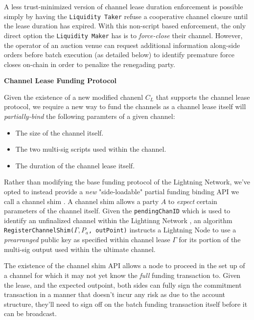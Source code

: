 \documentclass[10pt,a4paper]{article}
\theoremstyle{definition}
\begin{document}
A less trust-minimized version of channel lease duration enforcement is
possible simply by having the \texttt{Liquidity Taker} refuse a cooperative
channel closure until the lease duration has expired. With this non-script
based enforcement, the only direct option the \texttt{Liquidity Maker} has is
to \emph{force-close} their channel. However, the operator of an auction venue
can request additional information along-side orders before batch execution (as
detailed below) to identify premature force closes on-chain in order to
penalize the renegading party.


\begin{center}
    \textbf{Channel Lease Funding Protocol}
\end{center}

Given the existence of a new modified chanenl $C_{L}$ that supports the channel
lease protocol, we require a new way to fund the channels as a channel
lease itself will \emph{partially-bind} the following paramters of a given
channel:
\begin{itemize}
    \item The size of the channel itself.
    \item The two multi-sig scripts used within the channel.
    \item The duration of the channel lease itself.
\end{itemize}

Rather than modifying the base funding protocol of the Lightning Network, we've
opted to instead provide a \emph{new} "side-loadable" partial funding binding
API we call a channel shim \cite{chanShim}. A channel shim allows a party $A$ to
\emph{expect} certain parameters of the channel itself. Given the
\texttt{pendingChanID} which is used to identify an unfinalized channel within
the Lightinng Network \cite{bolt2}, an algorithm \texttt{RegisterChannelShim($\Gamma,
P_{a}$, outPoint)} instructs a Lightning Node to use a \emph{prearranged} public key as
specified within channel lease $\Gamma$ for its portion of the multi-sig output
used within the ultimate channel.

The existence of the channel shim API allows a node to proceed in the set up of
a channel for which it may not yet know the \emph{full} funding transaction to.
Given the lease, and the expected outpoint, both sides can fully sign the
commitment transaction in a manner that doesn't incur any risk as due to the
account structure, they'll need to sign off on the batch funding transaction
itself before it can be broadcast.
\end{document}
